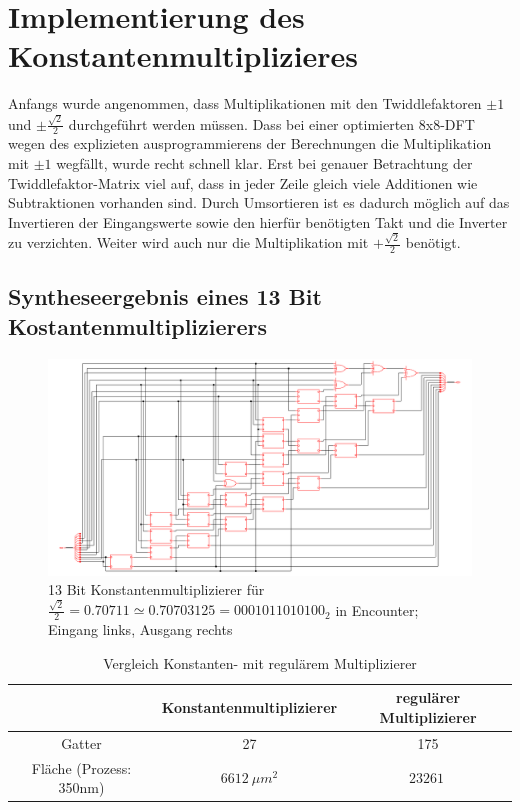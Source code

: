 \section{Implementierung des Konstantenmultiplizieres}\label{sec:Konstantenmultiplizierer}

Anfangs wurde angenommen, dass Multiplikationen mit den Twiddlefaktoren $\pm 1$ und $\pm\frac{\sqrt{2}}{2}$ durchgeführt werden müssen. 
Dass bei einer optimierten 8x8-DFT wegen des explizieten ausprogrammierens der Berechnungen die Multiplikation mit $\pm1$ wegfällt, wurde recht schnell klar.
Erst bei genauer Betrachtung der Twiddlefaktor-Matrix viel auf, dass in jeder Zeile gleich viele Additionen wie Subtraktionen vorhanden sind. Durch Umsortieren 
ist es dadurch möglich auf das Invertieren der Eingangswerte sowie den hierfür benötigten Takt und die Inverter zu verzichten. Weiter wird auch nur die Multiplikation
mit $+\frac{\sqrt{2}}{2}$ benötigt.

\subsection{Syntheseergebnis eines 13 Bit Kostantenmultiplizierers}
\begin{figure}[!ht]
\centering  
  \includegraphics[width=1\textwidth]{img/13Bit_Konstantenmultiplizierer_Netlist.png}
  \caption{13 Bit Konstantenmultiplizierer für $\frac{\sqrt{2}}{2} = 0.70711 \simeq 0.70703125 = 0001011010100_2$ in Encounter; Eingang links, Ausgang rechts}
\end{figure}



\begin{table}[!ht]
 \caption{Vergleich Konstanten- mit regulärem Multiplizierer}
 \label{tab:VergleichMultiplizierer}
 \begin{tabular}{ccc}
 \hline
				& Konstantenmultiplizierer 	& regulärer Multiplizierer\\
  \hline	
  Gatter			& 27				& 175 \\
  Fläche (Prozess: 350nm)	& $\SI{6612}{\mu m^2}$		& $\SI{23261}{}$\\
  \hline
 \end{tabular}
\end{table}





